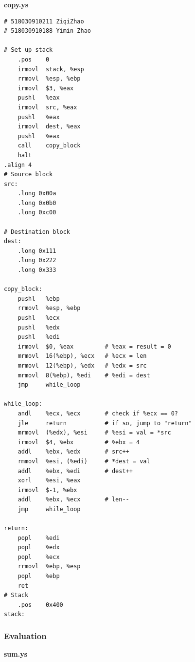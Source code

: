 \documentclass{article}
\begin{document}
\begin{center}
        \textbf{copy.ys}
\end{center}
\begin{lstlisting}
# 518030910211 ZiqiZhao
# 518030910188 Yimin Zhao

# Set up stack
    .pos    0
    irmovl  stack, %esp
    rrmovl  %esp, %ebp
    irmovl  $3, %eax
    pushl   %eax
    irmovl  src, %eax
    pushl   %eax
    irmovl  dest, %eax
    pushl   %eax
    call    copy_block
    halt
.align 4
# Source block
src:
    .long 0x00a
    .long 0x0b0
    .long 0xc00

# Destination block
dest:
    .long 0x111
    .long 0x222
    .long 0x333

copy_block:
    pushl   %ebp
    rrmovl  %esp, %ebp
    pushl   %ecx
    pushl   %edx
    pushl   %edi
    irmovl  $0, %eax         # %eax = result = 0
    mrmovl  16(%ebp), %ecx   # %ecx = len
    mrmovl  12(%ebp), %edx   # %edx = src
    mrmovl  8(%ebp), %edi    # %edi = dest
    jmp     while_loop

while_loop:
    andl    %ecx, %ecx       # check if %ecx == 0?
    jle     return           # if so, jump to "return"
    mrmovl  (%edx), %esi     # %esi = val = *src
    irmovl  $4, %ebx         # %ebx = 4
    addl    %ebx, %edx       # src++
    rmmovl  %esi, (%edi)     # *dest = val
    addl    %ebx, %edi       # dest++
    xorl    %esi, %eax
    irmovl  $-1, %ebx
    addl    %ebx, %ecx       # len--
    jmp     while_loop

return:
    popl    %edi
    popl    %edx
    popl    %ecx
    rrmovl  %ebp, %esp
    popl    %ebp
    ret
# Stack 
    .pos    0x400
stack:
\end{lstlisting}
\pagebreak
\subsubsection{Evaluation}
\textbf{sum.ys}\\
\end{document}
